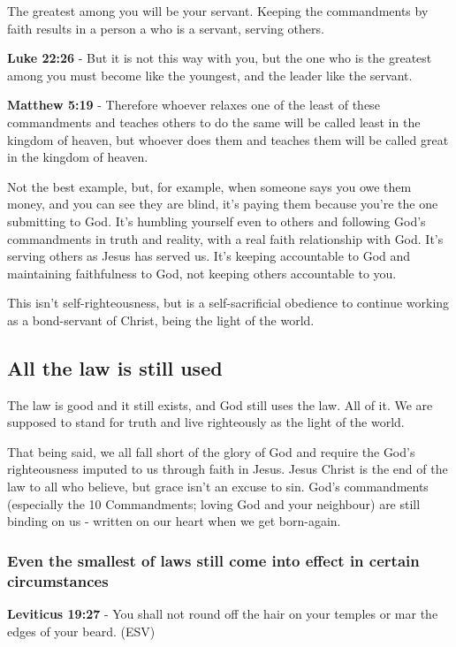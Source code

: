 \documentclass[11pt]{article}
\begin{document}
The greatest among you will be your servant.
Keeping the commandments by faith results in a person a who is a servant, serving others.

\textbf{Luke 22:26} - But it is not this way with you, but the one who is the greatest among you must become like the youngest, and the leader like the servant.

\textbf{Matthew 5:19} - Therefore whoever relaxes one of the least of these commandments and teaches others to do the same will be called least in the kingdom of heaven, but whoever does them and teaches them will be called great in the kingdom of heaven.

Not the best example, but, for example, when someone says you owe them money, and you can see they are blind, it's paying them because you're the one submitting to God.
It's humbling yourself even to others and following God's commandments in truth and reality, with a real faith relationship with God.
It's serving others as Jesus has served us.
It's keeping accountable to God and maintaining faithfulness to God, not keeping others accountable to you.

This isn't self-righteousness, but is a self-sacrificial obedience to continue working as a bond-servant of Christ, being the light of the world.

\subsection{All the law is still used}
\label{sec:org8c96899}
The law is good and it still exists, and God still uses the law. All of it. We are supposed to stand for truth and live righteously as the light of the world.

That being said, we all fall short of the glory of God and require the God's righteousness imputed to us through faith in Jesus.
Jesus Christ is the end of the law to all who believe, but grace isn't an excuse to sin.
God's commandments (especially the 10 Commandments; loving God and your neighbour) are still binding on us - written on our heart when we get born-again.

\subsubsection{Even the smallest of laws still come into effect in certain circumstances}
\label{sec:orgadcc81d}

\textbf{Leviticus 19:27} - You shall not round off the hair on your temples or mar the edges of your beard. (ESV)
\end{document}
